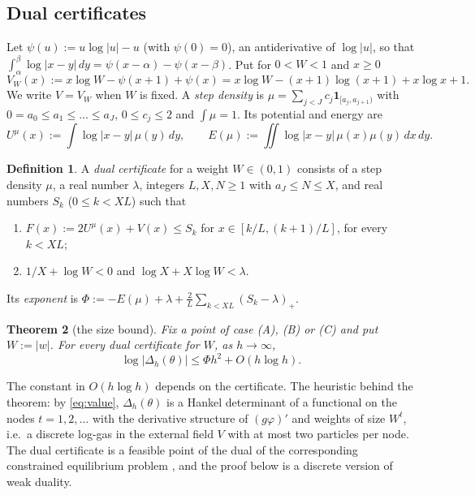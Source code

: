 \documentclass[11pt]{amsart}
\newtheorem{theorem}{Theorem}[section]
\theoremstyle{definition}
\newtheorem{definition}[theorem]{Definition}
\theoremstyle{remark}
\numberwithin{equation}{section}
\begin{document}
\subsection{Dual certificates}
Let $\psi(u):=u\log|u|-u$ (with $\psi(0)=0$), an antiderivative of $\log|u|$, so that
$\int_\alpha^\beta\log|x-y|\,dy=\psi(x-\alpha)-\psi(x-\beta)$. Put
for $0<W<1$ and $x\ge0$
\[
  V_W(x):=x\log W-\psi(x+1)+\psi(x)=x\log W-(x+1)\log(x+1)+x\log x+1 .
\]
We write $V=V_W$ when $W$ is fixed.
A \emph{step density} is $\mu=\sum_{j<J}c_j\mathbf 1_{[a_j,a_{j+1})}$ with $0=a_0\le a_1\le\dots\le a_J$, $0\le c_j\le2$ and
$\int\mu=1$. Its potential and energy are
\[
  U^\mu(x):=\int\log|x-y|\,\mu(y)\,dy,\qquad E(\mu):=\iint\log|x-y|\,\mu(x)\mu(y)\,dx\,dy .
\]

\begin{definition}\label{def:cert}
A \emph{dual certificate} for a weight $W\in(0,1)$ consists of a step density $\mu$, a real number $\lambda$, integers $L,X,N\ge1$ with
$a_J\le N\le X$, and real numbers $S_k$ ($0\le k<XL$) such that
\begin{enumerate}
\item $F(x):=2U^\mu(x)+V(x)\le S_k$ for $x\in[k/L,(k+1)/L]$, for every $k<XL$;
\item $1/X+\log W<0$ and $\log X+X\log W<\lambda$.
\end{enumerate}
Its \emph{exponent} is $\Phi:=-E(\mu)+\lambda+\frac2L\sum_{k<XL}(S_k-\lambda)_+$.
\end{definition}

\begin{theorem}[the size bound]\label{thm:size}
Fix a point of case (A), (B) or (C) and put $W:=|w|$. For every dual certificate for $W$, as $h\to\infty$,
\[
  \log|\Delta_h(\theta)|\le\Phi h^2+O(h\log h).
\]
\end{theorem}

The constant in $O(h\log h)$ depends on the certificate. The heuristic behind the theorem: by \eqref{eq:value},
$\Delta_h(\theta)$ is a Hankel determinant of a functional on the nodes $t=1,2,\dots$ with the
derivative structure of $(g\varphi)'$ and weights of size $W^t$, i.e.\ a discrete log-gas in the external field $V$ with at most two
particles per node. The dual certificate is a feasible point of the dual of the corresponding constrained
equilibrium problem \cite[Ch.~I]{SaffTotik}, and the proof below is a discrete version of weak duality.
\end{document}
